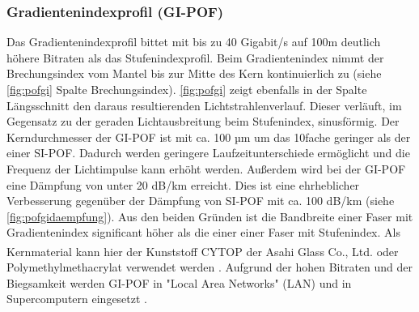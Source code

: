 \subsubsection{Gradientenindexprofil (GI-POF)}

Das Gradientenindexprofil bittet mit bis zu 40 Gigabit/s auf 100m deutlich
höhere Bitraten als das Stufenindexprofil. Beim Gradientenindex nimmt der
Brechungsindex vom Mantel bis zur Mitte des Kern kontinuierlich zu (siehe
\autoref{fig:pofgi} Spalte Brechungsindex). \autoref{fig:pofgi} zeigt ebenfalls
in der Spalte Längsschnitt den daraus resultierenden Lichtstrahlenverlauf.
Dieser verläuft, im Gegensatz zu der geraden Lichtausbreitung beim Stufenindex,
sinusförmig. Der Kerndurchmesser der GI-POF ist mit ca. 100 µm um das 10fache
geringer als der einer SI-POF. Dadurch werden geringere Laufzeitunterschiede
ermöglicht und die Frequenz der Lichtimpulse kann erhöht werden. Außerdem wird
bei der GI-POF eine Dämpfung von unter 20 dB/km erreicht. Dies ist eine
ehrheblicher Verbesserung gegenüber der Dämpfung von SI-POF mit ca. 100 dB/km
(siehe \autoref{fig:pofgidaempfung}). Aus den beiden Gründen ist die Bandbreite
einer Faser mit Gradientenindex significant höher als die einer einer Faser mit
Stufenindex. Als Kernmaterial kann hier der Kunststoff
CYTOP\textsuperscript{\texttrademark} der Asahi Glass Co., Ltd. oder
Polymethylmethacrylat verwendet werden \cite{pofacgif}. Aufgrund der hohen
Bitraten und der Biegsamkeit werden GI-POF in "Local Area
Networks" (LAN) und in Supercomputern eingesetzt \cite{poflee}.

